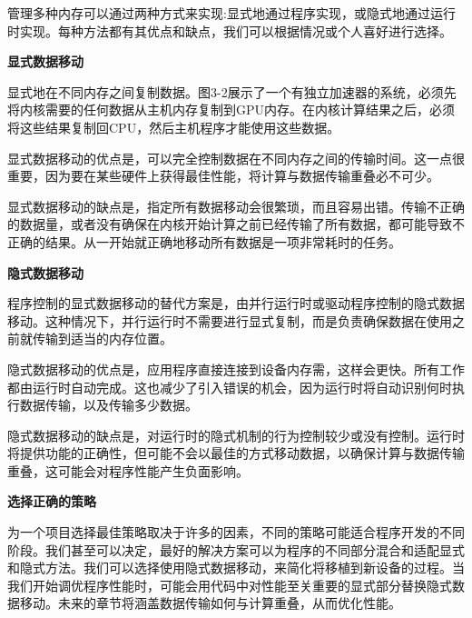 管理多种内存可以通过两种方式来实现:显式地通过程序实现，或隐式地通过运行时实现。每种方法都有其优点和缺点，我们可以根据情况或个人喜好进行选择。\par

\hspace*{\fill} \par %
\textbf{显式数据移动}

显式地在不同内存之间复制数据。图3-2展示了一个有独立加速器的系统，必须先将内核需要的任何数据从主机内存复制到GPU内存。在内核计算结果之后，必须将这些结果复制回CPU，然后主机程序才能使用这些数据。\par

显式数据移动的优点是，可以完全控制数据在不同内存之间的传输时间。这一点很重要，因为要在某些硬件上获得最佳性能，将计算与数据传输重叠必不可少。\par

显式数据移动的缺点是，指定所有数据移动会很繁琐，而且容易出错。传输不正确的数据量，或者没有确保在内核开始计算之前已经传输了所有数据，都可能导致不正确的结果。从一开始就正确地移动所有数据是一项非常耗时的任务。\par

\hspace*{\fill} \par %
\textbf{隐式数据移动}

程序控制的显式数据移动的替代方案是，由并行运行时或驱动程序控制的隐式数据移动。这种情况下，并行运行时不需要进行显式复制，而是负责确保数据在使用之前就传输到适当的内存位置。\par

隐式数据移动的优点是，应用程序直接连接到设备内存需，这样会更快。所有工作都由运行时自动完成。这也减少了引入错误的机会，因为运行时将自动识别何时执行数据传输，以及传输多少数据。\par

隐式数据移动的缺点是，对运行时的隐式机制的行为控制较少或没有控制。运行时将提供功能的正确性，但可能不会以最佳的方式移动数据，以确保计算与数据传输重叠，这可能会对程序性能产生负面影响。\par

\hspace*{\fill} \par %
\textbf{选择正确的策略}

为一个项目选择最佳策略取决于许多的因素，不同的策略可能适合程序开发的不同阶段。我们甚至可以决定，最好的解决方案可以为程序的不同部分混合和适配显式和隐式方法。我们可以选择使用隐式数据移动，来简化将移植到新设备的过程。当我们开始调优程序性能时，可能会用代码中对性能至关重要的显式部分替换隐式数据移动。未来的章节将涵盖数据传输如何与计算重叠，从而优化性能。\par















